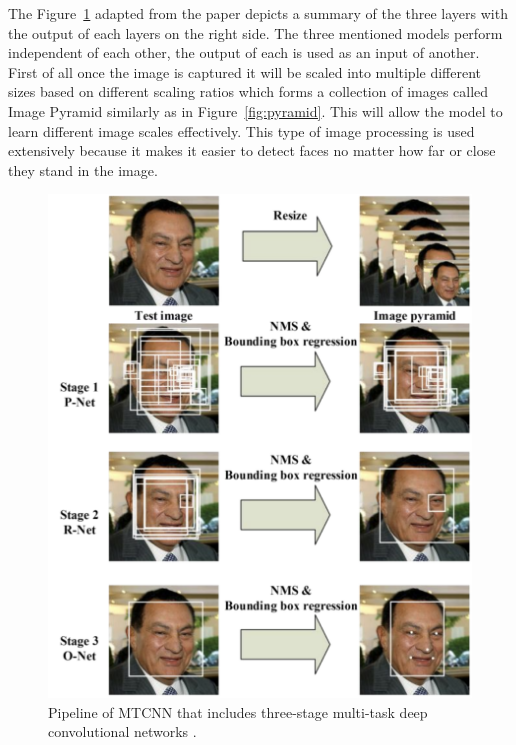 The Figure~\ref{fig:mtcnn} adapted from the paper depicts a summary of the three layers with the output of each layers on the right side. The three mentioned models perform independent of each other, the output of each is used as an input of another. 
First of all once the image is captured it will be scaled into multiple different sizes based on different scaling ratios which forms a collection of images called Image Pyramid similarly as in Figure~\ref{fig:pyramid}. This will allow the model to learn different image scales effectively. This type of image processing is used extensively because it makes it easier to detect faces no matter how far or close they stand in the image.


\begin{figure}[!htb]
    \centering
    \includegraphics[width=1\textwidth]{figures/mtcnn.png}
    \caption{ Pipeline of MTCNN that includes three-stage multi-task deep convolutional networks \cite{refmtcnn}.}
    \label{fig:mtcnn}
\end{figure}

